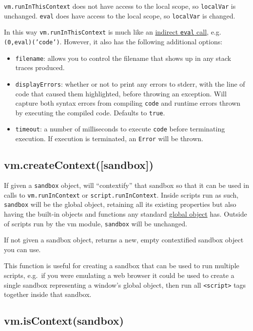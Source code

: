 \texttt{vm.runInThisContext} does not have access to the local scope, so
\texttt{localVar} is unchanged. \texttt{eval} does have access to the
local scope, so \texttt{localVar} is changed.

In this way \texttt{vm.runInThisContext} is much like an
\href{http://es5.github.io/\#x10.4.2}{indirect \texttt{eval} call}, e.g.
\texttt{(0,eval)('code')}. However, it also has the following additional
options:

\begin{itemize}
\item
  \texttt{filename}: allows you to control the filename that shows up in
  any stack traces produced.
\item
  \texttt{displayErrors}: whether or not to print any errors to stderr,
  with the line of code that caused them highlighted, before throwing an
  exception. Will capture both syntax errors from compiling
  \texttt{code} and runtime errors thrown by executing the compiled
  code. Defaults to \texttt{true}.
\item
  \texttt{timeout}: a number of milliseconds to execute \texttt{code}
  before terminating execution. If execution is terminated, an
  \texttt{Error} will be thrown.
\end{itemize}

\subsection{vm.createContext({[}sandbox{]})}

If given a \texttt{sandbox} object, will ``contextify'' that sandbox so
that it can be used in calls to \texttt{vm.runInContext} or
\texttt{script.runInContext}. Inside scripts run as such,
\texttt{sandbox} will be the global object, retaining all its existing
properties but also having the built-in objects and functions any
standard \href{http://es5.github.io/\#x15.1}{global object} has. Outside
of scripts run by the vm module, \texttt{sandbox} will be unchanged.

If not given a sandbox object, returns a new, empty contextified sandbox
object you can use.

This function is useful for creating a sandbox that can be used to run
multiple scripts, e.g.~if you were emulating a web browser it could be
used to create a single sandbox representing a window's global object,
then run all \texttt{\textless{}script\textgreater{}} tags together
inside that sandbox.

\subsection{vm.isContext(sandbox)}


